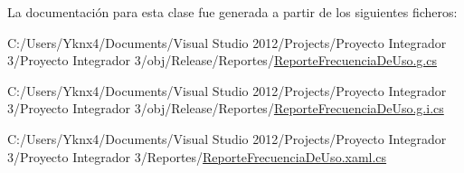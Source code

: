 La documentación para esta clase fue generada a partir de los siguientes ficheros\-:\begin{DoxyCompactItemize}
\item 
C\-:/\-Users/\-Yknx4/\-Documents/\-Visual Studio 2012/\-Projects/\-Proyecto Integrador 3/\-Proyecto Integrador 3/obj/\-Release/\-Reportes/\hyperlink{_reporte_frecuencia_de_uso_8g_8cs}{Reporte\-Frecuencia\-De\-Uso.\-g.\-cs}\item 
C\-:/\-Users/\-Yknx4/\-Documents/\-Visual Studio 2012/\-Projects/\-Proyecto Integrador 3/\-Proyecto Integrador 3/obj/\-Release/\-Reportes/\hyperlink{_reporte_frecuencia_de_uso_8g_8i_8cs}{Reporte\-Frecuencia\-De\-Uso.\-g.\-i.\-cs}\item 
C\-:/\-Users/\-Yknx4/\-Documents/\-Visual Studio 2012/\-Projects/\-Proyecto Integrador 3/\-Proyecto Integrador 3/\-Reportes/\hyperlink{_reporte_frecuencia_de_uso_8xaml_8cs}{Reporte\-Frecuencia\-De\-Uso.\-xaml.\-cs}\end{DoxyCompactItemize}
